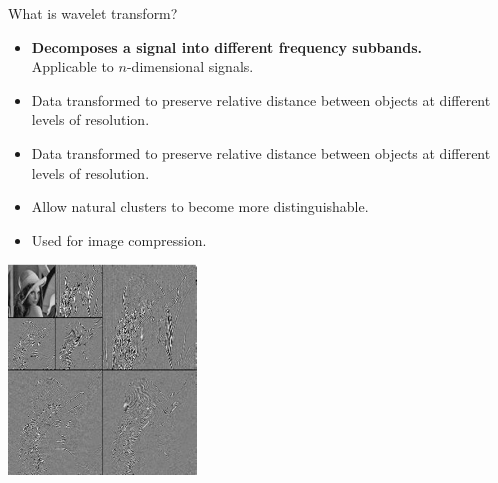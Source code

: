\documentclass[aspectratio=169,t]{beamer}
\begin{document}
  { 
    \begin{frame}{What is wavelet transform?}
    \begin{minipage}[b]{0.55\textwidth}
      \begin{itemize}
        \item \textbf{Decomposes a signal into different frequency subbands.}\\
              Applicable to $n$-dimensional signals.
        \item Data transformed to preserve relative distance between objects at different levels of resolution.
        \item Data transformed to preserve relative distance between objects at different levels of resolution.
        \item Allow natural clusters to become more distinguishable.
        \item Used for image compression.
      \end{itemize}
    \end{minipage}\hspace{1cm}
    \begin{minipage}[b]{0.30\textwidth}
      \includegraphics[width=5cm]{img/wavelettransform.png}
    \end{minipage}
    \end{frame}
  }
\end{document}
